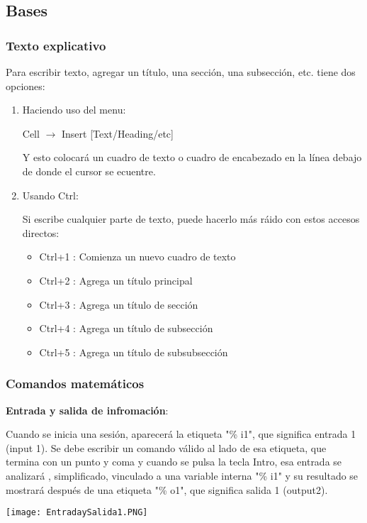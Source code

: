 \documentclass{article}
\begin{document}
\subsection{Bases}
\subsubsection{Texto explicativo}
Para escribir texto, agregar un título, una sección, una subsección, etc. tiene dos opciones:
\begin{enumerate}
\item Haciendo uso del menu:

\centerline {Cell $\longrightarrow$ Insert [Text/Heading/etc]}


Y esto colocará un cuadro de texto o cuadro de encabezado en la línea debajo de donde el cursor se ecuentre.

\item Usando Ctrl:

Si escribe cualquier parte de texto, puede hacerlo más ráido con estos accesos directos:
\begin{itemize}
\item Ctrl+1 : Comienza un nuevo cuadro de texto
\item Ctrl+2 : Agrega un título principal
\item Ctrl+3 : Agrega un título de sección
\item Ctrl+4 : Agrega un título de subsección
\item Ctrl+5 : Agrega un título de subsubsección
\end{itemize}
\end{enumerate}
\subsubsection{Comandos matemáticos}

\textbf{Entrada y salida de infromación}: 

Cuando se inicia una sesión, aparecerá la etiqueta "\% i1", que significa entrada 1 (input 1). Se debe escribir un comando válido al lado de esa etiqueta, que termina con un punto y coma y cuando se pulsa la tecla Intro, esa entrada se analizará , simplificado, vinculado a una variable interna "\% i1" y su resultado se mostrará después de una etiqueta "\% o1", que significa salida 1 (output2).

\begin{center}
\texttt{[image: EntradaySalida1.PNG]}
\end{center}
\end{document}
